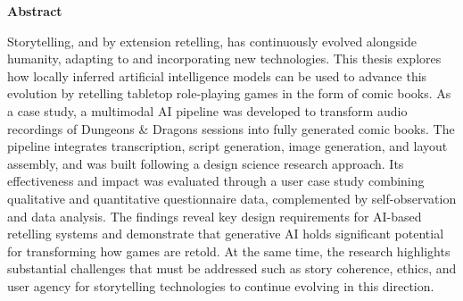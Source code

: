 {\Large
\noindent
{\bf Abstract}} \\
\vspace*{0.3 cm}

\noindent
Storytelling, and by extension retelling, has continuously evolved alongside humanity, adapting to and incorporating new technologies. This thesis explores how locally inferred artificial intelligence models can be used to advance this evolution by retelling tabletop role-playing games in the form of comic books. As a case study, a multimodal AI pipeline was developed to transform audio recordings of Dungeons \& Dragons sessions into fully generated comic books. The pipeline integrates transcription, script generation, image generation, and layout assembly, and was built following a design science research approach. Its effectiveness and impact was evaluated through a user case study combining qualitative and quantitative questionnaire data, complemented by self-observation and data analysis. The findings reveal key design requirements for AI-based retelling systems and demonstrate that generative AI holds significant potential for transforming how games are retold. At the same time, the research highlights substantial challenges that must be addressed such as story coherence, ethics, and user agency for storytelling technologies to continue evolving in this direction.
